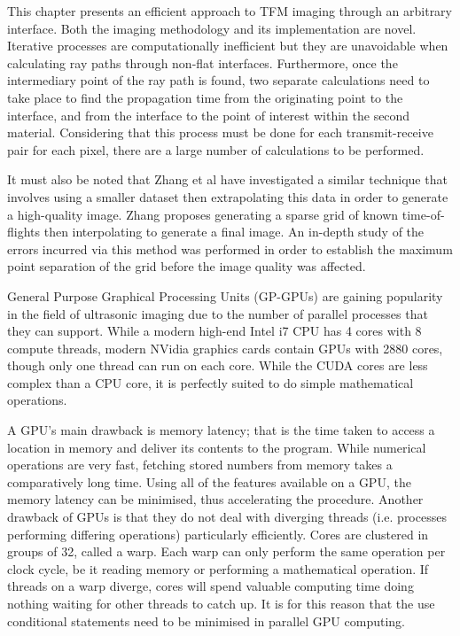 This chapter presents an efficient approach to TFM imaging through an arbitrary interface. Both the imaging methodology and its implementation are novel. Iterative processes are computationally inefficient but they are unavoidable when calculating ray paths through non-flat interfaces. Furthermore, once the intermediary point of the ray path is found, two separate calculations need to take place to find the propagation time from the originating point to the interface, and from the interface to the point of interest within the second material. Considering that this process must be done for each transmit-receive pair for each pixel, there are a large number of calculations to be performed.

It must also be noted that Zhang et al have investigated a similar technique\cite{zhang_efficient_2014} that involves using a smaller dataset then extrapolating this data in order to generate a high-quality image. Zhang proposes generating a sparse grid of known time-of-flights then interpolating to generate a final image. An in-depth study of the errors incurred via this method was performed in order to establish the maximum point separation of the grid before the image quality was affected. 

General Purpose Graphical Processing Units (GP-GPUs) are gaining popularity in the field of ultrasonic imaging due to the number of parallel processes that they can support. While a modern high-end Intel i7 CPU has 4 cores with 8 compute threads, modern NVidia graphics cards contain GPUs with 2880 cores, though only one thread can run on each core. While the CUDA cores are less complex than a CPU core, it is perfectly suited to do simple mathematical operations.

A GPU's main drawback is memory latency; that is the time taken to access a location in memory and deliver its contents to the program. While numerical operations are very fast, fetching stored numbers from memory takes a comparatively long time. Using all of the features available on a GPU, the memory latency can be minimised, thus accelerating the procedure. Another drawback of GPUs is that they do not deal with diverging threads (i.e. processes performing differing operations) particularly efficiently. Cores are clustered in groups of 32, called a warp. Each warp can only perform the same operation per clock cycle, be it reading memory or performing a mathematical operation. If threads on a warp diverge, cores will spend valuable computing time doing nothing waiting for other threads to catch up. It is for this reason that the use conditional statements need to be minimised in parallel GPU computing.

